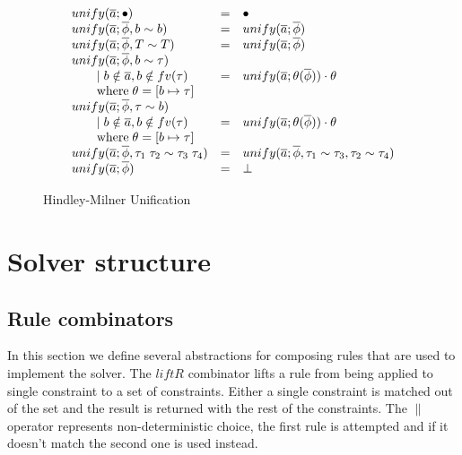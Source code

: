 \begin{figure}
\[
\begin{array}{l c l}
unify(\overline{a}; \bullet) &=& \bullet
\\
unify(\overline{a}; \overline{\phi}, b \sim b) &=& unify(\overline{a};
\overline{\phi})
\\
unify(\overline{a}; \overline{\phi}, T \sim T) &=& unify(\overline{a};
\overline{\phi})
\\
unify(\overline{a}; \overline{\phi}, b \sim \tau)
\\ \qquad \mid b \notin \overline{a}, b \notin fv(\tau) &=& unify(\overline{a};
\theta(\overline{\phi})) \cdot \theta
\\ \qquad \text{where} \; \theta = [b \mapsto \tau]
\\
unify(\overline{a}; \overline{\phi}, \tau \sim b)
\\ \qquad \mid b \notin \overline{a}, b \notin fv(\tau) &=& unify(\overline{a};
\theta(\overline{\phi})) \cdot \theta
\\ \qquad \text{where} \; \theta = [b \mapsto \tau]
\\
unify(\overline{a}; \overline{\phi}, \tau_1 \; \tau_2 \sim \tau_3 \; \tau_4) &=&
unify(\overline{a}; \overline{\phi}, \tau_1 \sim \tau_3, \tau_2 \sim \tau_4)
\\
unify(\overline{a}; \overline{\phi}) &=& \bot
\end{array}
\]
\caption{Hindley-Milner Unification}
\label{fig:unify}
\end{figure}

\section{Solver structure}

\subsection{Rule combinators}
In this section we define several abstractions for composing rules that are used
to implement the solver. The $liftR$ combinator lifts a rule from being applied
to single constraint to a set of constraints. Either a single constraint is
matched out of the set and the result is returned with the rest of the
constraints. The $\|$ operator represents non-deterministic choice, the first
rule is attempted and if it doesn't match the second one is used instead.

